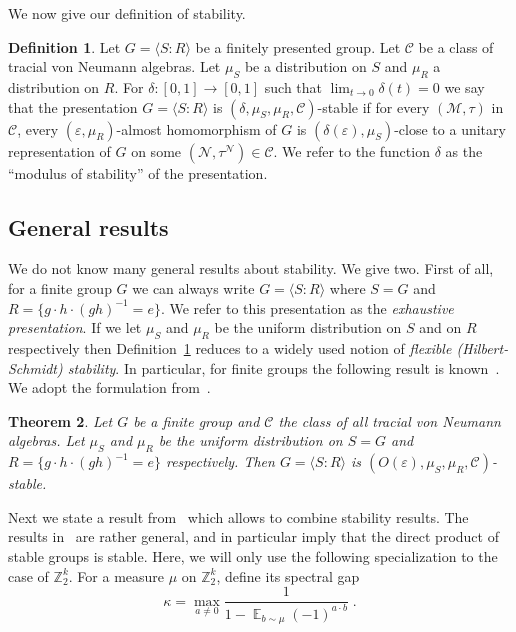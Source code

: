 \documentclass[11pt]{article}
\newtheorem{theorem}{Theorem}[section]
\theoremstyle{definition}
\newtheorem{definition}[theorem]{Definition}
\DeclareMathOperator*{\Expectation}{\mathbb{E}}
\newcommand{\Es}[1]{\Expectation_{#1}}
\newcommand{\Z}{\ensuremath{\mathbb{Z}}}
\newcommand{\mC}{\ensuremath{\mathcal{C}}}
\newcommand{\cM}{\ensuremath{\mathcal{M}}}
\newcommand{\eps}{\varepsilon}
\newcommand{\mN}{\mathcal{N}}
\begin{document}
We now give our definition of stability.

\begin{definition}\label{def:eff-stab}
Let $G = \langle S:R\rangle $ be a finitely presented group. Let $\mC$ be a class of tracial von Neumann algebras. Let $\mu_S$ be a distribution on $S$ and $\mu_R$ a distribution on $R$. For $\delta:[0,1]\to[0,1]$ such that $\lim_{t\to 0}\delta(t)=0$ we say that  the presentation $G=\langle S:R\rangle$ is $(\delta,\mu_S,\mu_R,\mC)$-stable if for every $(\cM,\tau)$ in $\mC$, every $(\eps,\mu_R)$-almost homomorphism of $G$ is $(\delta(\eps),\mu_S)$-close to a unitary representation of $G$ on some $(\mN,\tau^\mN)\in \mC$.  We refer to the function $\delta$ as the ``modulus of stability'' of the presentation.
\end{definition}



\subsection{General results}

We do not know many general results about stability. We give two. First of all, 
for a finite group $G$ we can always write $G=\langle S:R\rangle$ where $S = G$ and $R=\{ g\cdot h \cdot (gh)^{-1} =e \}$. We refer to this presentation as the \emph{exhaustive presentation}. If we let $\mu_S$ and $\mu_R$ be the uniform distribution on $S$ and on $R$ respectively then Definition~\ref{def:eff-stab} reduces to a widely used notion of \emph{flexible (Hilbert-Schmidt) stability}. In particular, for finite groups the following result is known~\cite{gowers2017inverse,de2019operator}. We adopt the formulation from~\cite[Theorem 1.4]{de2022spectral}.

\begin{theorem}\label{thm:gh}
Let $G$ be a finite group and $\mC$ the class of all tracial von Neumann algebras. Let $\mu_S$ and $\mu_R$ be the uniform distribution on $S=G$ and $R=\{ g\cdot h \cdot (gh)^{-1}=e \}$ respectively. Then $G=\langle S:R\rangle$ is $(O(\eps),\mu_S,\mu_R,\mC)$-stable.  
\end{theorem}

Next we state a result from~\cite{de2022spectral} which allows to combine stability results. The results in~\cite{de2022spectral} are rather general, and in particular imply that the direct product of stable groups is stable. Here, we will only use the following specialization to the case of $\Z_2^k$. For a measure $\mu$ on $\Z_2^k$, define its spectral gap 
\[ \kappa = \max_{a\neq 0} \frac{1}{1-\Es{b\sim\mu}(-1)^{a\cdot b}}\;.\] 
\end{document}
